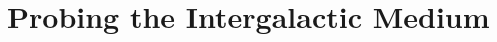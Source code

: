 \documentclass[preprint]{/Users/jesse/tex/aastex_JRF}
\begin{document}
\section{Probing the Intergalactic Medium}

 

\end{document}
